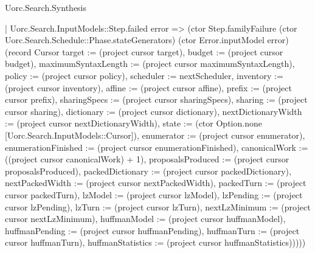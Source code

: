 \begin{lexlean}{Uorc.Search.Synthesis}
\begin{semanticmodule}
{          | Uorc.Search.InputModels::Step.failed error => (ctor Step.familyFailure (ctor Uorc.Search.Schedule::Phase.stateGenerators) (ctor Error.inputModel error) (record Cursor {target := (project cursor target), budget := (project cursor budget), maximumSyntaxLength := (project cursor maximumSyntaxLength), policy := (project cursor policy), scheduler := nextScheduler, inventory := (project cursor inventory), affine := (project cursor affine), prefix := (project cursor prefix), sharingSpecs := (project cursor sharingSpecs), sharing := (project cursor sharing), dictionary := (project cursor dictionary), nextDictionaryWidth := (project cursor nextDictionaryWidth), state := (ctor Option.none [Uorc.Search.InputModels::Cursor]), enumerator := (project cursor enumerator), enumerationFinished := (project cursor enumerationFinished), canonicalWork := ((project cursor canonicalWork) + 1), proposalsProduced := (project cursor proposalsProduced), packedDictionary := (project cursor packedDictionary), nextPackedWidth := (project cursor nextPackedWidth), packedTurn := (project cursor packedTurn), lzModel := (project cursor lzModel), lzPending := (project cursor lzPending), lzTurn := (project cursor lzTurn), nextLzMinimum := (project cursor nextLzMinimum), huffmanModel := (project cursor huffmanModel), huffmanPending := (project cursor huffmanPending), huffmanTurn := (project cursor huffmanTurn), huffmanStatistics := (project cursor huffmanStatistics)}))))
}
\end{semanticmodule}
\end{lexlean}
